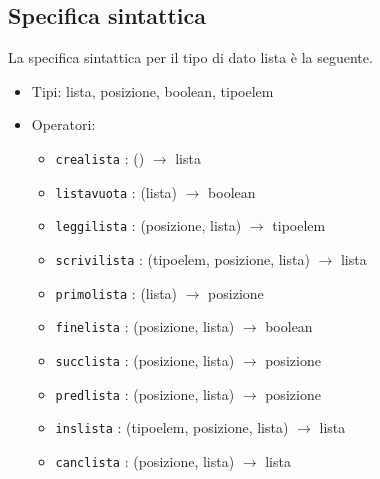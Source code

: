 \documentclass[12pt]{report}
\begin{document}
	\subsection{Specifica sintattica}
	La specifica sintattica per il tipo di dato lista è la seguente.
	\begin{itemize}
		\item Tipi: lista, posizione, boolean, tipoelem
		\item Operatori:
		\begin{itemize}
			\item \texttt{crealista} : () \(\rightarrow\) lista
			\item \texttt{listavuota} : (lista) \(\rightarrow\) boolean
			\item \texttt{leggilista} : (posizione, lista) \(\rightarrow\) tipoelem
			\item \texttt{scrivilista} : (tipoelem, posizione, lista) \(\rightarrow\) lista
			\item \texttt{primolista} : (lista) \(\rightarrow\) posizione
			\item \texttt{finelista} : (posizione, lista) \(\rightarrow\) boolean
			\item \texttt{succlista} : (posizione, lista) \(\rightarrow\) posizione
			\item \texttt{predlista} : (posizione, lista) \(\rightarrow\) posizione
			\item \texttt{inslista} : (tipoelem, posizione, lista) \(\rightarrow\) lista
			\item \texttt{canclista} : (posizione, lista) \(\rightarrow\) lista
		\end{itemize}
	\end{itemize}
\end{document}
